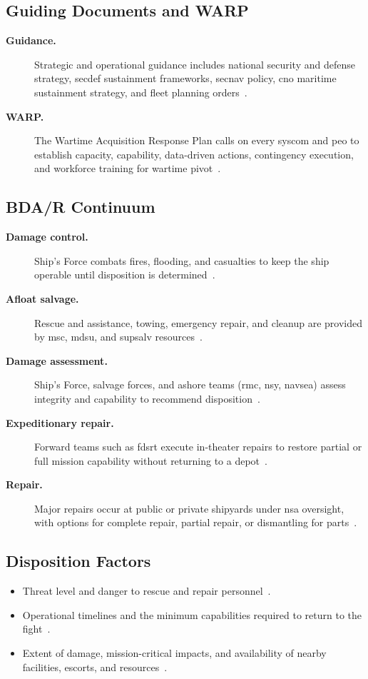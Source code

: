 \documentclass[../main.tex]{subfiles}
\begin{document}
\subsection{Guiding Documents and WARP}
\begin{description}
  \item[\textbf{Guidance.}] Strategic and operational guidance includes national security and defense strategy, \ac{secdef} sustainment frameworks, \ac{secnav} policy, \ac{cno} maritime sustainment strategy, and fleet planning orders~\autocite{edo-4-1-6-bdar-2025}.
  \item[\textbf{WARP.}] The Wartime Acquisition Response Plan calls on every \ac{syscom} and \ac{peo} to establish capacity, capability, data-driven actions, contingency execution, and workforce training for wartime pivot~\autocite{edo-4-1-6-bdar-2025}.
\end{description}

\subsection{BDA/R Continuum}
\begin{description}
  \item[\textbf{Damage control.}] Ship's Force combats fires, flooding, and casualties to keep the ship operable until disposition is determined~\autocite{edo-4-1-6-bdar-2025}.
  \item[\textbf{Afloat salvage.}] Rescue and assistance, towing, emergency repair, and cleanup are provided by \ac{msc}, \ac{mdsu}, and \ac{supsalv} resources~\autocite{edo-4-1-6-bdar-2025}.
  \item[\textbf{Damage assessment.}] Ship's Force, salvage forces, and ashore teams (\ac{rmc}, \ac{nsy}, \ac{navsea}) assess integrity and capability to recommend disposition~\autocite{edo-4-1-6-bdar-2025}.
  \item[\textbf{Expeditionary repair.}] Forward teams such as \ac{fdsrt} execute in-theater repairs to restore partial or full mission capability without returning to a depot~\autocite{edo-4-1-6-bdar-2025}.
  \item[\textbf{Repair.}] Major repairs occur at public or private shipyards under \ac{nsa} oversight, with options for complete repair, partial repair, or dismantling for parts~\autocite{edo-4-1-6-bdar-2025}.
\end{description}

\subsection{Disposition Factors}
\begin{itemize}
  \item Threat level and danger to rescue and repair personnel~\autocite{edo-4-1-6-bdar-2025}.
  \item Operational timelines and the minimum capabilities required to return to the fight~\autocite{edo-4-1-6-bdar-2025}.
  \item Extent of damage, mission-critical impacts, and availability of nearby facilities, escorts, and resources~\autocite{edo-4-1-6-bdar-2025}.
\end{itemize}
\end{document}
